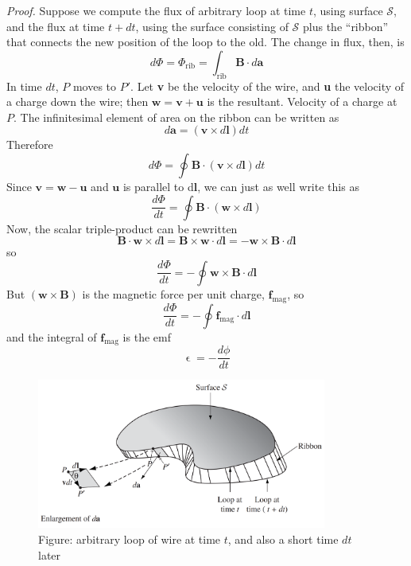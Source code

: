 \documentclass[../../../main.tex]{subfiles}
\begin{document}
\emph{Proof.} Suppose we compute the ﬂux of arbitrary loop at time $t$, using surface $\mathcal{S}$, and the ﬂux at time $t + dt$, using the surface consisting of $\mathcal{S}$ plus the “ribbon” that connects the new position of the loop to the old. The change in ﬂux, then, is
\begin{equation*}
    d\Phi=\Phi_\text{rib}=\int_\text{rib} \mathbf{B}\cdot d\mathbf{a}
\end{equation*}
In time $dt$, $P$ moves to $P'$.  Let \textbf{v} be the velocity of the wire, and \textbf{u} the velocity of a charge down the wire; then $\mathbf{w} = \mathbf{v} + \mathbf{u}$ is the resultant. Velocity of a charge at $P$. The inﬁnitesimal element of area on the ribbon can be written as
\begin{equation*}
    d\mathbf{a} = (\mathbf{v} \times d\mathbf{l}) dt
\end{equation*}
Therefore
\begin{equation*}
    d\Phi=\oint\mathbf{B}\cdot  (\mathbf{v} \times d\mathbf{l}) dt
\end{equation*}
Since $\mathbf{v}=\mathbf{w}-\mathbf{u}$ and $\mathbf{u}$ is parallel to d\textbf{l}, we can just as well write this as 
\begin{equation*}
    \frac{d\Phi}{dt}=\oint\mathbf{B}\cdot  (\mathbf{w} \times d\mathbf{l})
\end{equation*}
Now, the scalar triple-product can be rewritten
\begin{equation*}
    \mathbf{B}\cdot \mathbf{w}\times d\mathbf{l}=\mathbf{B}\times \mathbf{w}\cdot d\mathbf{l}= -\mathbf{w}\times\mathbf{B} \cdot d\mathbf{l}
\end{equation*}
so
\begin{equation*}
    \frac{d\Phi}{dt}=-\oint\mathbf{w}\times\mathbf{B} \cdot d\mathbf{l}
\end{equation*}
But $(\mathbf{w}\times\mathbf{B} )$ is the magnetic force per unit charge, $\mathbf{f}_\text{mag}$, so
\begin{equation*}
    \frac{d\Phi}{dt}=-\oint\mathbf{f}_\text{mag}\cdot d\mathbf{l}
\end{equation*}
and the integral of $\mathbf{f}_\text{mag}$ is the emf
\begin{equation*}
    \upvarepsilon=-\frac{d\phi}{dt}
\end{equation*}

\begin{figure}
    \centering
    \includegraphics[width=0.85\textwidth]{../Rss/Electromagnetism/Electrodynamics/FluxRule.png}
    \caption*{Figure:  arbitrary loop of wire at time $t$, and also a short time $dt$ later}
\end{figure}
\end{document}
